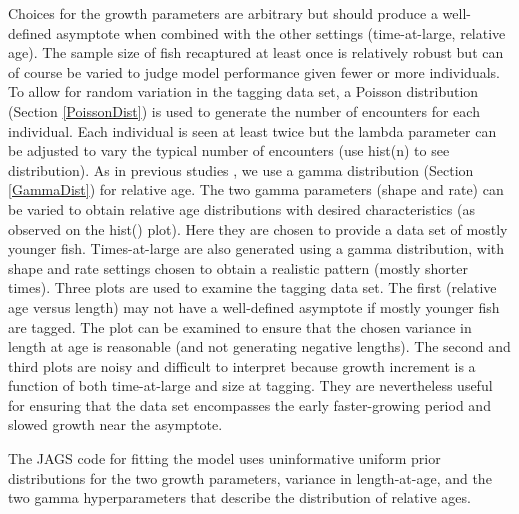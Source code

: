 \documentclass[
]{krantz}
\begin{document}
Choices for the growth parameters are arbitrary but should produce a well-defined asymptote when combined with the other settings (time-at-large, relative age). The sample size of fish recaptured at least once is relatively robust but can of course be varied to judge model performance given fewer or more individuals. To allow for random variation in the tagging data set, a Poisson distribution (Section \ref{PoissonDist}) is used to generate the number of encounters for each individual. Each individual is seen at least twice but the lambda parameter can be adjusted to vary the typical number of encounters (use hist(n) to see distribution). As in previous studies \citep{wang.etal1995, zhang.etal2009, scherrer.etal2021}, we use a gamma distribution (Section \ref{GammaDist}) for relative age. The two gamma parameters (shape and rate) can be varied to obtain relative age distributions with desired characteristics (as observed on the hist() plot). Here they are chosen to provide a data set of mostly younger fish. Times-at-large are also generated using a gamma distribution, with shape and rate settings chosen to obtain a realistic pattern (mostly shorter times). Three plots are used to examine the tagging data set. The first (relative age versus length) may not have a well-defined asymptote if mostly younger fish are tagged. The plot can be examined to ensure that the chosen variance in length at age is reasonable (and not generating negative lengths). The second and third plots are noisy and difficult to interpret because growth increment is a function of both time-at-large and size at tagging. They are nevertheless useful for ensuring that the data set encompasses the early faster-growing period and slowed growth near the asymptote.

The JAGS code for fitting the model uses uninformative uniform prior distributions for the two growth parameters, variance in length-at-age, and the two gamma hyperparameters that describe the distribution of relative ages.
\end{document}

